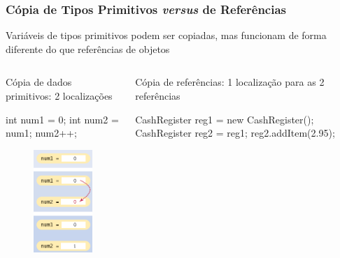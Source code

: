 \documentclass[xcolor={dvipsnames,table},aspectratio=169]{beamer}
\begin{document}
\begin{frame}[fragile]\frametitle{Cópia de Tipos Primitivos \emph{versus} de Referências}
\begin{itemize}
{\small
	\item Variáveis de tipos primitivos podem ser copiadas, mas funcionam de forma diferente do que referências de objetos
}
\end{itemize}
\begin{columns}[T]
	\begin{column}{0.4\linewidth}
\begin{itemize}
{\small
	\item Cópia de dados primitivos: 2 localizações
{\scriptsize
\begin{javacode}
int num1 = 0;
int num2 = num1;
num2++;
\end{javacode}
}
\begin{figure}[h]
	\includegraphics[height=0.35\paperheight,center]{pucrs-ep-fprog-unidade_07-objetos_e_classes-laminas-copia_de_primitivos.png}
\end{figure}
}
\end{itemize}
	\end{column}
	\begin{column}{0.5\linewidth}
\begin{itemize}
{\scriptsize
	\item Cópia de referências: 1 localização para as 2 referências
{\scriptsize
\begin{javacode}
CashRegister reg1 = new CashRegister();
CashRegister reg2 = reg1;
reg2.addItem(2.95);
\end{javacode}
}
\begin{figure}[h]

\end{figure}}
\end{itemize}
\end{column}
\end{columns}
\end{frame}
\end{document}
